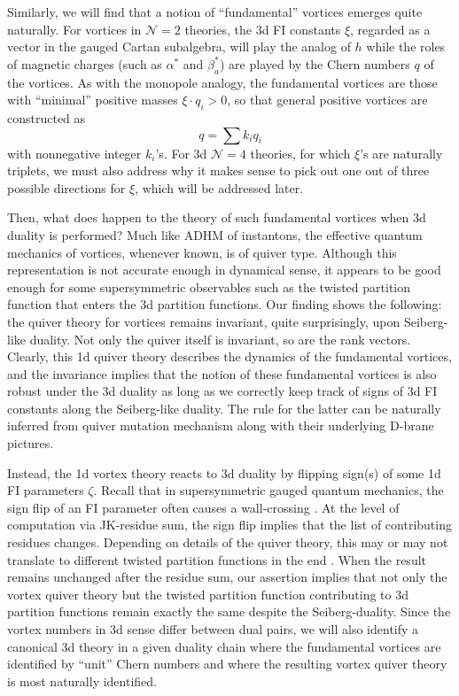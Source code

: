 \documentclass[a4paper,11pt]{article}
\begin{document}
Similarly, we will find that a notion of ``fundamental'' vortices
emerges quite naturally. For vortices in $\mathcal N=2$ theories,
the 3d FI constants $\xi$, regarded as a vector in the gauged
Cartan subalgebra, will play the analog of $h$ while the roles
of magnetic charges (such as $\alpha^*$ and $\beta_a^*$) are
played by the Chern numbers $q$ of the vortices. As with the
monopole analogy, the fundamental vortices are those with
``minimal'' positive masses $\xi\cdot q_i > 0$, so that general
positive vortices are constructed as
$$q= \sum k_i q_i$$
with nonnegative integer $k_i$'s. For 3d $\mathcal N=4$ theories,
for which $\xi$'s are naturally triplets, we must also address
why it makes sense to pick out one out of three possible
directions for $\xi$, which will be addressed later.

Then, what does happen to the theory of such fundamental vortices
when 3d duality is performed? Much like ADHM of
instantons, the effective quantum mechanics of vortices,
whenever known, is of quiver type. Although this
representation is not accurate enough in dynamical sense,
it appears to be good enough for some supersymmetric observables
such as the twisted partition function that enters the 3d
partition functions. Our finding shows the following:
the quiver theory for vortices remains invariant, quite
surprisingly, upon Seiberg-like duality. Not only the
quiver itself is invariant, so are the rank vectors.
Clearly, this 1d quiver theory describes
the dynamics of the fundamental vortices, and the invariance
implies that the notion of these fundamental vortices is
also robust under the 3d duality as long as we correctly
keep track of signs of 3d FI constants along the Seiberg-like
duality. The rule for the latter can be naturally inferred
from quiver mutation mechanism  along with their underlying
D-brane pictures.

Instead, the 1d vortex theory reacts to 3d duality by
flipping sign(s) of some 1d FI parameters $\zeta$.
Recall that in supersymmetric gauged quantum mechanics,
the sign flip of an FI parameter often causes a wall-crossing \cite{Denef:2002ru}.
At the level of computation via JK-residue sum, the sign flip
implies that the list of contributing residues changes.
Depending on details of the quiver theory, this may or may not
translate to different twisted partition functions in the end \cite{Hori:2014tda}.
When the result remains unchanged after the residue sum, our
assertion implies that not only the vortex quiver theory but
the twisted partition function contributing to 3d partition functions
remain exactly the same despite the Seiberg-duality.
Since the vortex numbers in 3d sense differ between dual pairs,
we will also identify a canonical 3d theory in a given duality
chain where the fundamental vortices are identified by
``unit'' Chern numbers and where the resulting vortex quiver
theory is most naturally identified.
\end{document}
